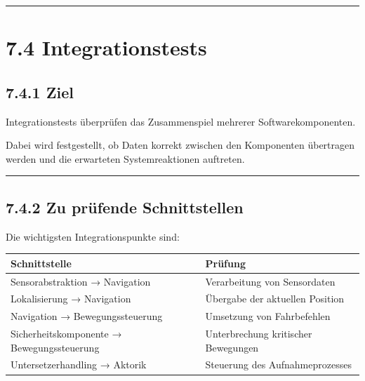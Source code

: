\documentclass[
  a4paper,
  12pt,
  DIV=12,        %
  parskip=half,  %
  headings=small %
]{scrartcl}
\theoremstyle{definition}
\theoremstyle{definition}
\begin{document}
\begin{center}\rule{0.5\linewidth}{0.5pt}\end{center}

\section{7.4 Integrationstests}\label{integrationstests-1}

\subsection{7.4.1 Ziel}\label{ziel-1}

Integrationstests überprüfen das Zusammenspiel mehrerer
Softwarekomponenten.

Dabei wird festgestellt, ob Daten korrekt zwischen den Komponenten
übertragen werden und die erwarteten Systemreaktionen auftreten.

\begin{center}\rule{0.5\linewidth}{0.5pt}\end{center}

\subsection{7.4.2 Zu prüfende
Schnittstellen}\label{zu-pruxfcfende-schnittstellen}

Die wichtigsten Integrationspunkte sind:

\begin{longtable}[]{@{}
  >{\raggedright\arraybackslash}p{}
  >{\raggedright\arraybackslash}p{}@{}}
\toprule\noalign{}
\begin{minipage}[b]{\linewidth}\raggedright
Schnittstelle
\end{minipage} & \begin{minipage}[b]{\linewidth}\raggedright
Prüfung
\end{minipage} \\
\midrule\noalign{}
\endhead
\bottomrule\noalign{}
\endlastfoot
Sensorabstraktion → Navigation & Verarbeitung von Sensordaten \\
Lokalisierung → Navigation & Übergabe der aktuellen Position \\
Navigation → Bewegungssteuerung & Umsetzung von Fahrbefehlen \\
Sicherheitskomponente → Bewegungssteuerung & Unterbrechung kritischer
Bewegungen \\
Untersetzerhandling → Aktorik & Steuerung des Aufnahmeprozesses \\
\end{longtable}
\end{document}
